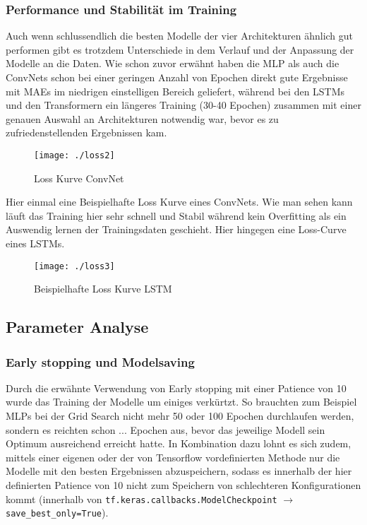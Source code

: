 \documentclass[acmtog, authorversion]{acmart} %
\begin{document}
\subsubsection{Performance und Stabilität im Training}
Auch wenn schlussendlich die besten Modelle der vier Architekturen ähnlich gut performen gibt es trotzdem Unterschiede in dem Verlauf und der Anpassung der Modelle an die Daten. Wie schon zuvor erwähnt haben die MLP als auch die ConvNets schon bei einer geringen Anzahl von Epochen direkt gute Ergebnisse mit MAEs im niedrigen einstelligen Bereich geliefert, während bei den LSTMs und den Transformern ein längeres Training (30-40 Epochen) zusammen mit einer genauen Auswahl an Architekturen notwendig war, bevor es zu zufriedenstellenden Ergebnissen kam.
\begin{figure}[H]
    \centering
    \texttt{[image: ./loss2]}
    \label{fig:sub7}
    \caption{Loss Kurve ConvNet}
\end{figure}
Hier einmal eine Beispielhafte Loss Kurve eines ConvNets. Wie man sehen kann läuft das Training hier sehr schnell und Stabil während kein Overfitting als ein Auswendig lernen der Trainingsdaten geschieht.
Hier hingegen eine Loss-Curve eines LSTMs.
\begin{figure}[H]
    \centering
    \texttt{[image: ./loss3]}
    \label{fig:sub7}
    \caption{Beispielhafte Loss Kurve LSTM}
\end{figure}



\subsection{Parameter Analyse}

\subsubsection{Early stopping und Modelsaving}
Durch die erwähnte Verwendung von Early stopping mit einer Patience von 10 wurde das Training der Modelle um einiges verkürtzt. So brauchten zum Beispiel MLPs bei der Grid Search nicht mehr 50 oder 100 Epochen durchlaufen werden, sondern es reichten schon ...  Epochen aus, bevor das jeweilige Modell sein Optimum ausreichend erreicht hatte. In Kombination dazu lohnt es sich zudem, mittels einer eigenen oder der von Tensorflow vordefinierten Methode nur die Modelle mit den besten Ergebnissen abzuspeichern, sodass es innerhalb der hier definierten Patience von 10 nicht zum Speichern von schlechteren Konfigurationen kommt (innerhalb von \texttt{tf.keras.callbacks.ModelCheckpoint} $\rightarrow$  \texttt{save\_best\_only=True}).
\end{document}
